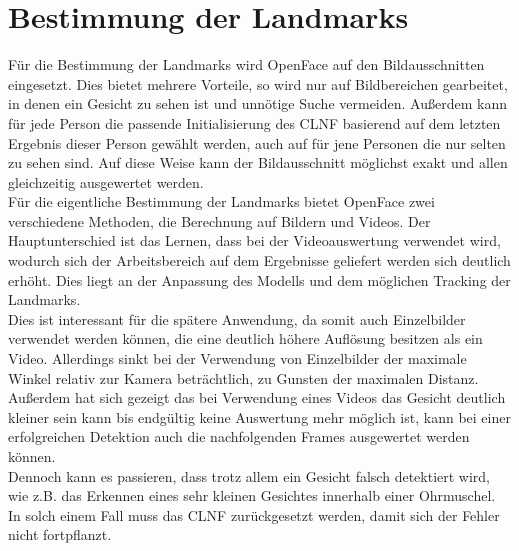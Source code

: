 \section{Bestimmung der Landmarks}
\label{bestimmung_Landmarks}
Für die Bestimmung der Landmarks wird OpenFace auf den Bildausschnitten eingesetzt. Dies bietet mehrere Vorteile, so wird nur auf Bildbereichen gearbeitet, in denen ein Gesicht zu sehen ist und unnötige Suche vermeiden. Außerdem kann für jede Person die passende Initialisierung des CLNF basierend auf dem letzten Ergebnis dieser Person gewählt werden, auch auf für jene Personen die nur selten zu sehen sind. Auf diese Weise kann der Bildausschnitt möglichst exakt und allen gleichzeitig ausgewertet werden.\\
Für die eigentliche Bestimmung der Landmarks bietet OpenFace zwei verschiedene Methoden, die Berechnung auf Bildern und Videos. Der Hauptunterschied ist das Lernen, dass bei der Videoauswertung verwendet wird, wodurch sich der Arbeitsbereich auf dem Ergebnisse geliefert werden sich deutlich erhöht. Dies liegt an der Anpassung des Modells und dem möglichen Tracking der Landmarks.\\
Dies ist interessant für die spätere Anwendung, da somit auch Einzelbilder verwendet werden können, die eine deutlich höhere Auflösung besitzen als ein Video. Allerdings sinkt bei der Verwendung von Einzelbilder der maximale Winkel relativ zur Kamera beträchtlich, zu Gunsten der maximalen Distanz. Außerdem hat sich gezeigt das bei Verwendung eines Videos das Gesicht deutlich kleiner sein kann bis endgültig keine Auswertung mehr möglich ist, kann bei einer erfolgreichen Detektion auch die nachfolgenden Frames ausgewertet werden können.\\
Dennoch kann es passieren, dass trotz allem ein Gesicht falsch detektiert wird, wie z.B. das Erkennen eines sehr kleinen Gesichtes innerhalb einer Ohrmuschel. In solch einem Fall muss das CLNF zurückgesetzt werden, damit sich der Fehler nicht fortpflanzt.